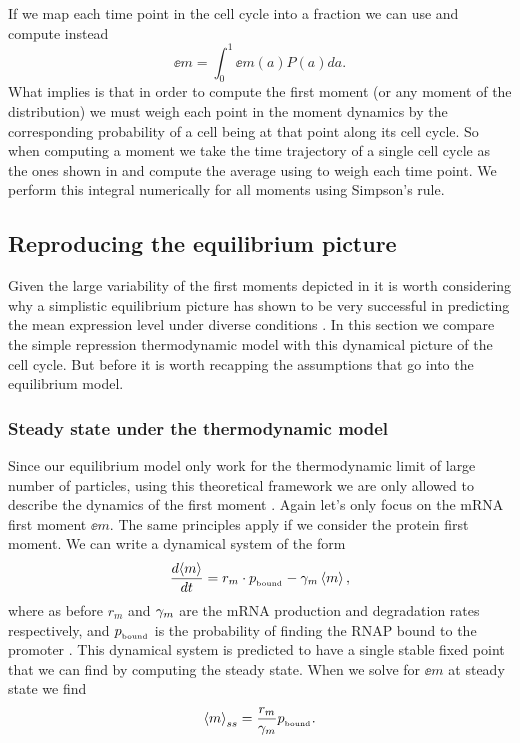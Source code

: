 If we map each time point in the cell cycle into a fraction we can use
 and compute instead
\begin{equation}
  \ee{m} = \int_0^1 \ee{m(a)} P(a) da.
  \label{seq_moment_avg}
\end{equation}
What  implies is that in order to compute the first moment
(or any moment of the distribution) we must weigh each point in the moment
dynamics by the corresponding probability of a cell being at that point along
its cell cycle. So when computing a moment we take the time trajectory of a
single cell cycle as the ones shown in  and compute
the average using  to weigh each time point. We perform this
integral numerically for all moments using Simpson's rule.

\subsection{Reproducing the equilibrium picture}

Given the large variability of the first moments depicted in
 it is worth considering why a simplistic
equilibrium picture has shown to be very successful in predicting the mean
expression level under diverse conditions \cite{Garcia2011c, Brewster2014,
Barnes2018, Razo-Mejia2018}. In this section we compare the simple repression
thermodynamic model with this dynamical picture of the cell cycle. But before it
is worth recapping the assumptions that go into the equilibrium model.

\subsubsection{Steady state under the thermodynamic model}

Since our equilibrium model only work for the thermodynamic limit of large
number of particles, using this theoretical framework we are only allowed to
describe the dynamics of the first moment \cite{Phillips2015}.
Again let's only focus on the mRNA first moment $\ee{m}$. The same principles
apply if we consider the protein first moment. We can write a dynamical system
of the form
\begin{equation}
  {d{\left\langle m \right\rangle} \over dt} = r_m \cdot p_{_\text{bound}} - \gamma _m \left\langle m \right\rangle,
\end{equation}
where as before $r_m$ and $\gamma _m$ are the mRNA production and degradation rates
respectively, and $p_{_\text{bound}}$ is the probability of finding the RNAP bound to the
promoter \cite{Bintu2005a}. This dynamical system is predicted to have a single
stable fixed point that we can find by computing the steady state. When we solve
for $\ee{m}$ at steady state we find
\begin{equation}
  \left\langle m \right\rangle_{ss} = {r_m \over \gamma _m} p_{_\text{bound}}.
\end{equation}

